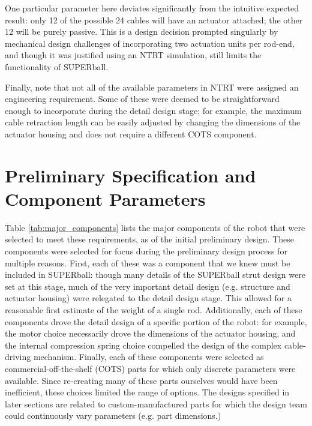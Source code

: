 \documentclass[12pt]{report}
\begin{document}
One particular parameter here deviates significantly from the intuitive expected result: only 12 of the possible 24 cables will have an actuator attached; the other 12 will be purely passive.
This is a design decision prompted singularly by mechanical design challenges of incorporating two actuation units per rod-end, and though it was justified using an NTRT simulation, still limits the functionality of SUPERball.

Finally, note that not all of the available parameters in NTRT were assigned an engineering requirement.
Some of these were deemed to be straightforward enough to incorporate during the detail design stage; for example, the maximum cable retraction length can be easily adjusted by changing the dimensions of the actuator housing and does not require a different COTS component.



\section{Preliminary Specification and Component Parameters}

Table \ref{tab:major_components} lists the major components of the robot that were selected to meet these requirements, as of the initial preliminary design.
These components were selected for focus during the preliminary design process for multiple reasons.
First, each of these was a component that we knew must be included in SUPERball: though many details of the SUPERball strut design were set at this stage, much of the very important detail design (e.g. structure and actuator housing) were relegated to the detail design stage.
This allowed for a reasonable first estimate of the weight of a single rod.
Additionally, each of these components drove the detail design of a specific portion of the robot: for example, the motor choice necessarily drove the dimensions of the actuator housing, and the internal compression spring choice compelled the design of the complex cable-driving mechanism.
Finally, each of these components were selected as commercial-off-the-shelf (COTS) parts for which only discrete parameters were available.
Since re-creating many of these parts ourselves would have been inefficient, these choices limited the range of options.
The designs specified in later sections are related to custom-manufactured parts for which the design team could continuously vary parameters (e.g. part dimensions.)
\end{document}
